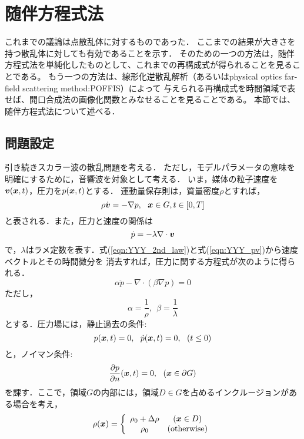 \section{随伴方程式法}
これまでの議論は点散乱体に対するものであった．
ここまでの結果が大きさを持つ散乱体に対しても有効であることを示す．
そのための一つの方法は，随伴方程式法を単純化したものとして、これまでの再構成式が得られることを見ることである。
もう一つの方法は、線形化逆散乱解析（あるいはphysical optics far-field scattering method:POFFIS）によって
与えられる再構成式を時間領域で表せば、開口合成法の画像化関数とみなせることを見ることである。
本節では、随伴方程式法について述べる．
\subsection{問題設定}
引き続きスカラー波の散乱問題を考える．
ただし，モデルパラメータの意味を明確にするために，音響波を対象として考える．
いま，媒体の粒子速度を$\mbox{\boldmath $v$}(\mbox{\boldmath $x$},t)$，圧力を$p(\mbox{\boldmath $x$},t)$とする．
運動量保存則は，質量密度$\rho$とすれば，
\begin{equation}
	\rho \dot{\fat{v}}= -\nabla p, \ \ \fat{x}\in G, t\in [0,T]
	\label{eqn:YYY_2nd_law}
\end{equation}
と表される．また，圧力と速度の関係は
\begin{equation}
	\dot{p}=-\lambda \nabla \cdot \mbox{\boldmath $v$}
	\label{eqn:YYY_pv}
\end{equation}
で，$\lambda$はラメ定数を表す．式(\ref{eqn:YYY_2nd_law})と式(\ref{eqn:YYY_pv})から速度ベクトルとその時間微分を
消去すれば，圧力に関する方程式が次のように得られる．
\begin{equation}
	\alpha \ddot{p}-\nabla \cdot \left(\beta  \nabla  p \right)=0
	\label{eqn:YYY_wveq_p}
\end{equation}
ただし，
\begin{equation}
	\alpha = \frac{1}{\rho}, \ \ \beta=\frac{1}{\lambda}
	\label{eqn:YYY_consts_ab}
\end{equation}
とする．圧力場には，静止過去の条件:
\begin{equation}
	p(\fat{x},t)=0, \ \ \dot{p}(\fat{x},t)=0, \ \ (t\leq 0)
	\label{eqn:YYY_IC_p}
\end{equation}
と，ノイマン条件:
\begin{equation}
	\frac{\partial p}{\partial n}(\fat{x},t)=0, \ \ \left( \fat{x} \in  \partial G \right)
	\label{eqn:YYY_BC_p}
\end{equation}
を課す．ここで，領域$G$の内部には，領域$D\in G$を占めるインクルージョンがある場合を考え，
\begin{equation}
	\rho (\mbox{\boldmath $x$})=
	\left\{
	\begin{array}{cc}
		\rho_0 +\Delta \rho & (\mbox{\boldmath $x$}\in D) \\
		\rho_0 & (\rm otherwise)
	\end{array}
	\right.
	\label{eqn:YYY_rho_x}
\end{equation}
